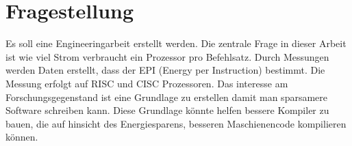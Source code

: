 \chapter{Fragestellung}

Es soll eine Engineeringarbeit erstellt werden. Die zentrale Frage in dieser Arbeit ist wie viel Strom
verbraucht ein Prozessor pro Befehlsatz. Durch Messungen werden Daten erstellt, dass der EPI (Energy per Instruction)
bestimmt. Die Messung erfolgt auf RISC und CISC Prozessoren. Das interesse am Forschungsgegenstand ist eine Grundlage
zu erstellen damit man sparsamere Software schreiben kann. Diese Grundlage könnte helfen bessere Kompiler zu bauen,
die auf hinsicht des Energiesparens, besseren Maschienencode kompilieren können. 

